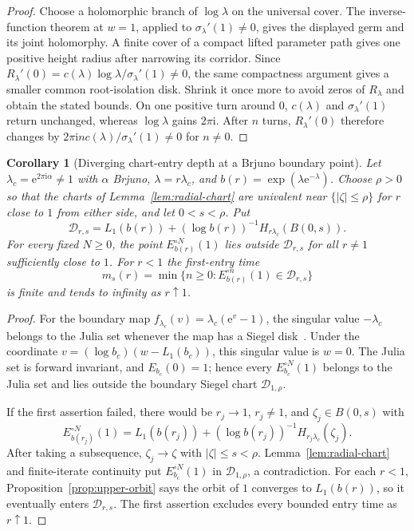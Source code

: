 \documentclass[11pt]{amsart}
\newtheorem{corollary}[theorem]{Corollary}
\theoremstyle{definition}
\newcommand{\eee}{\mathrm{e}}
\newcommand{\ii}{\mathrm{i}}
\begin{document}
\begin{proof}
Choose a holomorphic branch of $\log\lambda$ on the
universal cover.  The inverse-function theorem at $w=1$, applied to
$\sigma_\lambda'(1)\ne0$, gives the displayed germ and its joint
holomorphy.  A finite cover of a compact lifted parameter path gives
one positive height radius after narrowing its corridor.  Since
$R_\lambda'(0)=c(\lambda)\log\lambda/\sigma_\lambda'(1)\ne0$,
the same compactness argument gives a smaller common root-isolation
disk.  Shrink it once more to avoid zeros of $R_\lambda$ and obtain
the stated bounds.  On one positive turn around $0$, $c(\lambda)$ and
$\sigma_\lambda'(1)$ return unchanged, whereas $\log\lambda$ gains
$2\pi\ii$.  After $n$ turns, $R_\lambda'(0)$ therefore changes by
$2\pi\ii n c(\lambda)/\sigma_\lambda'(1)\ne0$ for $n\ne0$.
\end{proof}

\begin{corollary}[Diverging chart-entry depth at a Brjuno boundary point]
\label{cor:entry-depth}
Let $\lambda_c=\eee^{2\pi\ii\alpha}\ne1$ with $\alpha$ Brjuno,
$\lambda=r\lambda_c$, and
$b(r)=\exp(\lambda\eee^{-\lambda})$.  Choose $\rho>0$ so that the
charts of Lemma~\ref{lem:radial-chart} are univalent near
$\{|\zeta|\le\rho\}$ for $r$ close to $1$ from either side, and let
$0<s<\rho$.  Put
\[
 \mathcal D_{r,s}=L_1(b(r))+(\log b(r))^{-1}
                         H_{r\lambda_c}(B(0,s)).
\]
For every fixed $N\ge0$, the point $E_{b(r)}^{\circ N}(1)$ lies outside
$\mathcal D_{r,s}$ for all $r\ne1$ sufficiently close to $1$.
For $r<1$ the first-entry time
\[
 m_s(r)=\min\{n\ge0:E_{b(r)}^{\circ n}(1)\in\mathcal D_{r,s}\}
\]
is finite and tends to infinity as $r\uparrow1$.
\end{corollary}

\begin{proof}
For the boundary map $f_{\lambda_c}(v)=\lambda_c(\eee^v-1)$,
the singular value $-\lambda_c$ belongs to the Julia set whenever
the map has a Siegel disk~\cite[Introduction, remark after
Thm.~2]{Rempe2008}.  Under the coordinate
$v=(\log b_c)(w-L_1(b_c))$, this singular value is $w=0$.
The Julia set is forward invariant, and $E_{b_c}(0)=1$; hence
every $E_{b_c}^{\circ N}(1)$ belongs to the Julia set and lies outside
the boundary Siegel chart $\mathcal D_{1,\rho}$.

If the first assertion failed, there would be $r_j\to1$, $r_j\ne1$,
and $\zeta_j\in B(0,s)$ with
\[
 E_{b(r_j)}^{\circ N}(1)
 =L_1(b(r_j))+(\log b(r_j))^{-1}H_{r_j\lambda_c}(\zeta_j).
\]
After taking a subsequence, $\zeta_j\to\zeta$ with $|\zeta|\le s<\rho$.
Lemma~\ref{lem:radial-chart} and finite-iterate continuity put
$E_{b_c}^{\circ N}(1)$ in $\mathcal D_{1,\rho}$, a contradiction.
For each $r<1$, Proposition~\ref{prop:upper-orbit} says the orbit of $1$
converges to $L_1(b(r))$, so it eventually enters
$\mathcal D_{r,s}$.  The first assertion excludes every bounded entry
time as $r\uparrow1$.
\end{proof}
\end{document}
